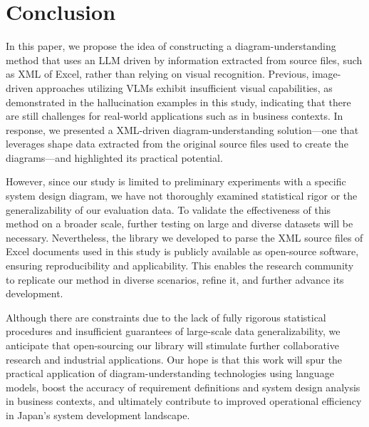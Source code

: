 \section{Conclusion}
In this paper, we propose the idea of constructing a diagram-understanding method that uses an LLM driven by information extracted from source files, such as XML of Excel, rather than relying on visual recognition. Previous, image-driven approaches utilizing VLMs exhibit insufficient visual capabilities, as demonstrated in the hallucination examples in this study, indicating that there are still challenges for real-world applications such as in business contexts. In response, we presented a XML-driven diagram-understanding solution—one that leverages shape data extracted from the original source files used to create the diagrams—and highlighted its practical potential.

However, since our study is limited to preliminary experiments with a specific system design diagram, we have not thoroughly examined statistical rigor or the generalizability of our evaluation data. To validate the effectiveness of this method on a broader scale, further testing on large and diverse datasets will be necessary. Nevertheless, the library we developed to parse the XML source files of Excel documents used in this study is publicly available as open-source software, ensuring reproducibility and applicability. This enables the research community to replicate our method in diverse scenarios, refine it, and further advance its development.

Although there are constraints due to the lack of fully rigorous statistical procedures and insufficient guarantees of large-scale data generalizability, we anticipate that open-sourcing our library will stimulate further collaborative research and industrial applications. Our hope is that this work will spur the practical application of diagram-understanding technologies using language models, boost the accuracy of requirement definitions and system design analysis in business contexts, and ultimately contribute to improved operational efficiency in Japan’s system development landscape.
